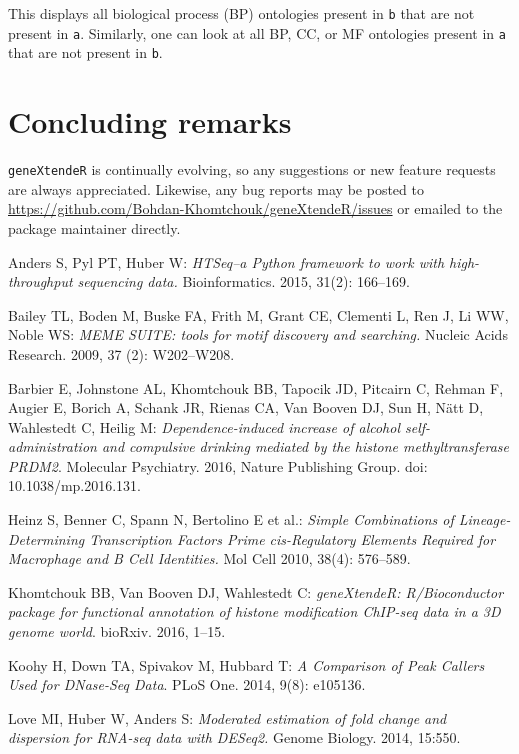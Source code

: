 \documentclass[12pt]{article}
\begin{document}
This displays all biological process (BP) ontologies present in \texttt{b} that are not present in \texttt{a}.  Similarly, one can look at all BP, CC, or MF ontologies present in \texttt{a} that are not present in \texttt{b}. 

\section*{Concluding remarks}

\texttt{geneXtendeR} is continually evolving, so any suggestions or new feature requests are always appreciated.  Likewise, any bug reports may be posted to \url{https://github.com/Bohdan-Khomtchouk/geneXtendeR/issues} or emailed to the package maintainer directly.    


\begin{thebibliography}{31}

Anders S, Pyl PT, Huber W:  \textit{HTSeq--a Python framework to work with high-throughput sequencing data.}  Bioinformatics.  2015, 31(2): 166--169. 

Bailey TL, Boden M, Buske FA, Frith M, Grant CE, Clementi L, Ren J, Li WW, Noble WS:  \textit{MEME SUITE: tools for motif discovery and searching.}  Nucleic Acids Research.  2009, 37 (2): W202--W208. 

Barbier E, Johnstone AL, Khomtchouk BB, Tapocik JD, Pitcairn C, Rehman F, Augier E, Borich A, Schank JR, Rienas CA, Van Booven DJ, Sun H, N\"{a}tt D, Wahlestedt C, Heilig M: \textit{Dependence-induced increase of alcohol self-administration and compulsive drinking mediated by the histone methyltransferase PRDM2}.  Molecular Psychiatry. 2016, Nature Publishing Group. doi: 10.1038/mp.2016.131.

Heinz S, Benner C, Spann N, Bertolino E et al.: \textit{Simple Combinations of Lineage-Determining Transcription Factors Prime cis-Regulatory Elements Required for Macrophage and B Cell Identities.} Mol Cell 2010, 38(4): 576--589.

Khomtchouk BB, Van Booven DJ, Wahlestedt C: \textit{geneXtendeR: R/Bioconductor package for functional annotation of histone modification ChIP-seq data in a 3D genome world}.  bioRxiv. 2016, 1--15. 

Koohy H, Down TA, Spivakov M, Hubbard T: \textit{A Comparison of Peak Callers Used for DNase-Seq Data}.  PLoS One. 2014, 9(8): e105136. 

Love MI, Huber W, Anders S:  \textit{Moderated estimation of fold change and dispersion for RNA-seq data with DESeq2.}  Genome Biology.  2014, 15:550.


\end{thebibliography}
\end{document}
